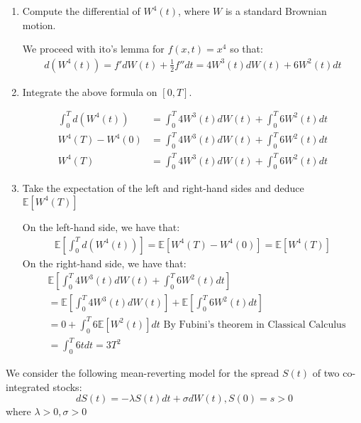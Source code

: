 \documentclass[12pt,twoside, letter]{exam}
\theoremstyle{definition}
\newcommand{\ee}{\mathbb{E}}
\begin{document}
  \begin{enumerate}
    \item Compute the differential of $W^4(t)$, where $W$ is a standard Brownian motion.
      \begin{solution}
        We proceed with ito's lemma for $f(x,t) = x^4$ so that:
        \begin{align*}
          d(W^4(t)) = f' dW(t) + \frac{1}{2} f'' dt  = 4W^3(t) dW(t) + 6W^2(t) dt
        \end{align*}
      \end{solution}
    \item Integrate the above formula on $[0,T]$.
      \begin{solution}
        \begin{align*}
          \int^T_0 d(W^4(t)) &= \int^T_0 4W^3(t) dW(t) + \int^T_0 6W^2(t) dt \\
          W^4(T) - W^4(0) &= \int^T_0 4W^3(t) dW(t) + \int^T_0 6W^2(t) dt \\
          W^4(T) &= \int^T_0 4W^3(t) dW(t) + \int^T_0 6W^2(t) dt
        \end{align*}
      \end{solution}
    \item Take the expectation of the left and right-hand sides and deduce $\ee[W^4(T)]$
      \begin{solution}
        On the left-hand side, we have that:
        \begin{align*}
          \ee[\int^T_{0} d(W^4(t))] = \ee[W^4(T)- W^4(0)] = \ee[W^4(T)]
        \end{align*}
        On the right-hand side, we have that:
        \begin{align*}
          &\ee[\int^T_0 4W^3(t) dW(t) + \int^T_0 6W^2(t) dt] \\
          &= \ee[\int^T_0 4W^3(t) dW(t)] + \ee[\int^T_0 6W^2(t) dt] \\
          &= 0 + \int^T_0 6\ee[W^2(t)] dt \text{ By Fubini's theorem in Classical Calculus} \\
          &= \int^T_0 6t dt = 3T^2
        \end{align*}
      \end{solution}
  \end{enumerate}

  \par{We consider the following mean-reverting model for the spread $S(t)$ of
  two co-integrated stocks:}
    \begin{equation*}
      dS(t) = -\lambda S(t) dt + \sigma dW(t), S(0) = s > 0
    \end{equation*}
where $\lambda > 0, \sigma > 0$
\end{document}
